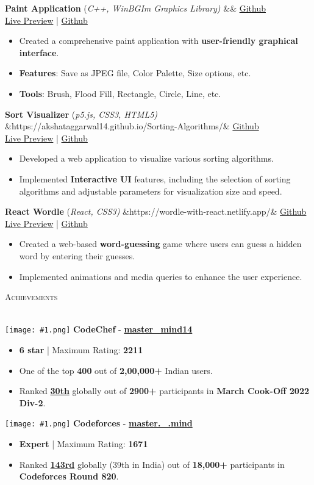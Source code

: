 \documentclass[a4paper]{article}
\newcommand{\tinyBulletSep} { \vspace{1mm} }
\newcommand{\bulletSep} { \vspace{2.5mm} }
\newcommand{\sectionSep} { \vspace{4mm} }
\newcommand{\lineunder} {
    \vspace*{-8pt} \\
    \hspace*{-15pt} \hrulefill \\
}
\newcommand{\header} [1] {
    {\hspace*{-18pt}\vspace*{6pt} {
        \fontfamily{qcs}\selectfont \large \scshape #1
    }}
    \vspace*{-6pt} \lineunder
    \vspace{0.5mm}
}
\newcommand{\projectItem}[5]{
    {\textbf{#1}} {(\sl #2)}\hfill
    \ifx&#3&%
    \href{#4}{Github}\\
    \else
    \href{#3}{Live Preview} | \href{#4}{Github}\\
    \fi
    \begin{itemize}
        #5
    \end{itemize}
}
\newcommand{\image}[1]{
    \begingroup\normalfont
    \Large
    \texttt{[image: \#1.png]}%
    \endgroup
}
\begin{document}
\projectItem{Paint Application}{C++, WinBGIm Graphics Library}{}{https://github.com/Sahil-187/Paint-Application}{
    \item Created a comprehensive paint application with \textbf{user-friendly graphical interface}.
    \item \textbf{Features}: Save as JPEG file, Color Palette, Size options, etc.
    \item \textbf{Tools}: Brush, Flood Fill, Rectangle, Circle, Line, etc.
}
\bulletSep

\projectItem{Sort Visualizer}{p5.js, CSS3, HTML5}{https://akshataggarwal14.github.io/Sorting-Algorithms/}{https://github.com/AkshatAggarwal14/Sorting-Algorithms/}{
    \item Developed a web application to visualize various sorting algorithms.
    \item Implemented \textbf{Interactive UI} features, including the selection of sorting algorithms and adjustable parameters for visualization size and speed.
}\bulletSep

\projectItem{React Wordle}{React, CSS3}{https://wordle-with-react.netlify.app/}{https://github.com/AkshatAggarwal14/react-wordle}{
    \item Created a web-based \textbf{word-guessing} game where users can guess a hidden word by entering their guesses.
    \item Implemented animations and media queries to enhance the user experience.
}
\sectionSep


\header{Achievements}
\image{cc} \textbf{CodeChef} - \textbf{\href{https://www.codechef.com/users/master_mind14}{master\_mind14}}
\begin{itemize}
    \item \textbf{6 star} | Maximum Rating: \textbf{2211}
    \item One of the top \textbf{400} out of \textbf{2,00,000+} Indian users.
    \item Ranked \textbf{\href{https://www.codechef.com/rankings/COOK139B?itemsPerPage=100&order=asc&page=1&search=master_mind14&sortBy=rank}{30th}} globally out of \textbf{2900+} participants in \textbf{March Cook-Off 2022 Div-2}.
\end{itemize}
\tinyBulletSep

\image{cf} \textbf{Codeforces} - \textbf{\href{https://codeforces.com/profile/master._.mind}{master.\_.mind}}
\begin{itemize}
    \item \textbf{Expert} | Maximum Rating: \textbf{1671}
    \item Ranked \textbf{\href{https://codeforces.com/contest/1729/standings/participant/140098304\#p140098304}{143rd}} globally (39th in India) out of \textbf{18,000+} participants in \textbf{Codeforces Round 820}.
\end{itemize}
\tinyBulletSep
\end{document}
